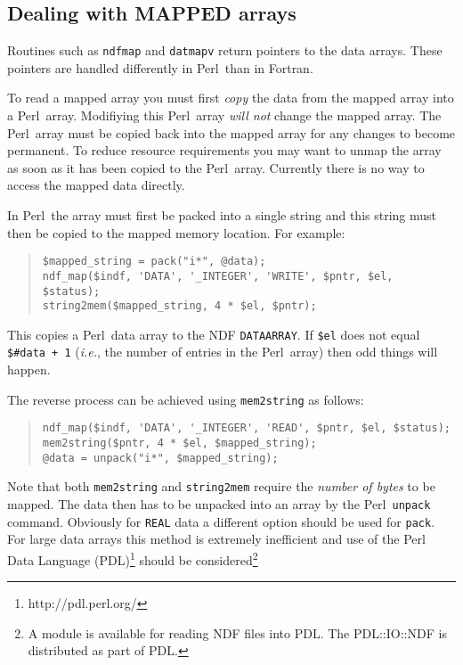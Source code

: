 \documentclass[twoside,11pt]{article}
\newenvironment{myquote}{\begin{quote}\begin{small}}{\end{small}\end{quote}}
\newcommand{\perl}{\xref{\textsf{Perl}}{sun193}{}}
\newcommand{\htmladdnormallinkfoot}[2]{#1\footnote{#2}}
\newcommand{\xref}[3]{#1}
\newcommand{\xlabel}[1]{}
\renewcommand{\_}{\texttt{\symbol{95}}}
\begin{document}
\subsection{\xlabel{dealing_with_mapped_arrays}Dealing with MAPPED arrays}%
\label{dealing_with_mapped_arrays}

Routines such as \texttt{ndf\_map} and \texttt{dat\_mapv} return
pointers to the data arrays. These pointers are handled differently in
\perl\ than in Fortran.

To read a mapped array you must first \emph{copy\/} the data from the mapped
array into a \perl\ array. Modifiying this \perl\ array \emph{will not\/} change
the mapped array. The \perl\ array must be copied back into the mapped 
array for any changes to become permanent. To reduce resource requirements
you may want to unmap the array as soon as it has been copied to the 
\perl\ array. Currently there is no way to access the mapped data directly.

In \perl\ the array must first be packed into a single string and this
string must then be copied to the mapped memory location.
For example:

\begin{myquote}
\begin{verbatim}
$mapped_string = pack("i*", @data);
ndf_map($indf, 'DATA', '_INTEGER', 'WRITE', $pntr, $el, $status);
string2mem($mapped_string, 4 * $el, $pntr);
\end{verbatim}
\end{myquote}

This copies a \perl\ data array to the NDF \texttt{DATA\_ARRAY}. If
\texttt{\$el} does not equal \texttt{\$\#data + 1} (\emph{i.e.}, the
number of entries in the \perl\ array) then odd things will happen.

The reverse process can be achieved using \texttt{mem2string} as follows:

\begin{myquote}
\begin{verbatim}
ndf_map($indf, 'DATA', '_INTEGER', 'READ', $pntr, $el, $status);
mem2string($pntr, 4 * $el, $mapped_string);
@data = unpack("i*", $mapped_string);
\end{verbatim}
\end{myquote}

Note that both \texttt{mem2string} and \texttt{string2mem} require the
\emph{number of bytes\/} to be mapped.  The data then has to be
unpacked into an array by the \perl\ \texttt{unpack} command. Obviously
for \texttt{\_REAL} data a different option should be used for
\texttt{pack}.  For large data arrays this method is extremely
inefficient and use of the \htmladdnormallinkfoot{Perl Data Language
(PDL)}{http://pdl.perl.org/} should be
considered\footnote{A module is available for reading NDF files into
PDL. The PDL::IO::NDF is distributed as part of PDL.}
\end{document}
